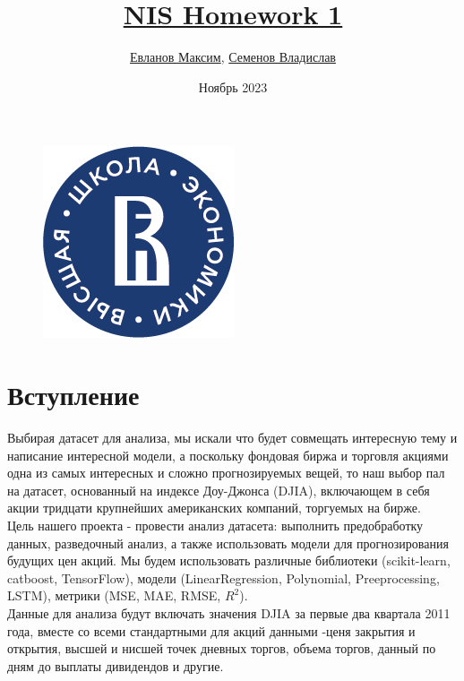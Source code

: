 \documentclass{article}
\begin{document}
\begin{titlepage}
\title{\href{https://github.com/Menako778/NIS_DJI}{\Huge NIS Homework 1}}
\author{
    \href{https://t.me/styleliferock}{Евланов Максим}, 
    \href{https://t.me/shervonemes}{Семенов Владислав}
}
\begin{figure}
    \centering
    \includegraphics[width=4 cm]{01_Logo_HSE_full_rus_Pantone.png}
\end{figure}
\date{\vspace{0cm} Ноябрь 2023}
\end{titlepage}

\maketitle

\tableofcontents{\vspace{3cm}}
\newpage
\section{Вступление}


Выбирая датасет для анализа, мы искали что будет совмещать интересную тему и написание интересной модели, а поскольку фондовая биржа и торговля акциями одна из самых интересных и сложно прогнозируемых вещей, то наш выбор пал на датасет, основанный на индексе Доу-Джонса (DJIA), включающем в себя акции тридцати крупнейших американских компаний, торгуемых на бирже.
\\

Цель нашего проекта - провести анализ датасета: выполнить предобработку данных, разведочный анализ, а также использовать модели для прогнозирования будущих цен акций. Мы будем использовать различные библиотеки (scikit-learn, catboost, TensorFlow), модели (LinearRegression, Polynomial, Preeprocessing, LSTM), метрики (MSE, MAE, RMSE, $R^2$).
\\

Данные для анализа будут включать значения DJIA за первые два квартала 2011 года, вместе со всеми стандартными для акций данными -ценя закрытия и открытия, высшей и нисшей точек дневных торгов, объема торгов, данный по дням до выплаты дивидендов и другие.
\\
\end{document}
